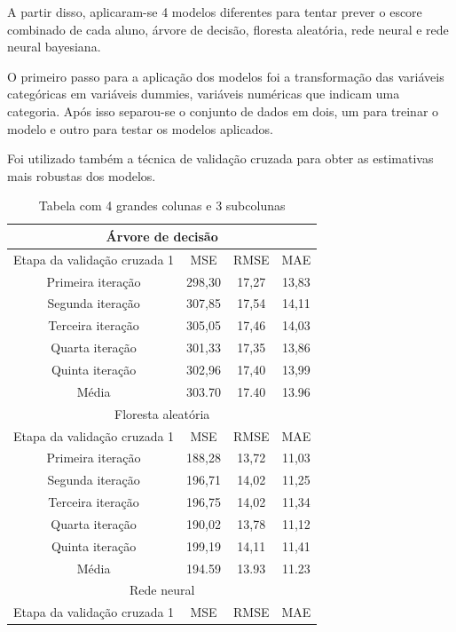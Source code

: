 A partir disso, aplicaram-se 4 modelos diferentes para tentar prever o escore combinado de cada aluno, árvore de decisão, floresta aleatória, rede neural e rede neural bayesiana.

O primeiro passo para a aplicação dos modelos foi a transformação das variáveis categóricas em variáveis dummies, variáveis numéricas que indicam uma categoria. Após isso separou-se o conjunto de dados em dois, um para treinar o modelo e outro para testar os modelos aplicados.

Foi utilizado também a técnica de validação cruzada para obter as estimativas mais robustas dos modelos.


\begin{table}[htbp]
    \centering
    \caption{Tabela com 4 grandes colunas e 3 subcolunas}
    \begin{tabular}{|c|c|c|c|}
        \hline
        \multicolumn{4}{|c|}{Árvore de decisão} \\ \hline
        Etapa da validação cruzada 1 & MSE & RMSE & MAE \\ \hline
        Primeira iteração & 298,30 & 17,27 & 13,83 \\ 
        Segunda iteração & 307,85 & 17,54 & 14,11 \\ 
        Terceira iteração & 305,05 & 17,46 & 14,03 \\ 
        Quarta iteração & 301,33 & 17,35 & 13,86 \\ 
        Quinta iteração & 302,96 & 17,40 & 13,99 \\ 
        Média & 303.70 & 17.40 & 13.96 \\
        \hline
        \multicolumn{4}{|c|}{Floresta aleatória} \\ \hline
        Etapa da validação cruzada 1 & MSE & RMSE & MAE \\ \hline
        Primeira iteração & 188,28 & 13,72 & 11,03 \\ 
        Segunda iteração & 196,71 & 14,02 & 11,25 \\ 
        Terceira iteração & 196,75 & 14,02 & 11,34 \\ 
        Quarta iteração & 190,02 & 13,78 & 11,12 \\ 
        Quinta iteração & 199,19 & 14,11 & 11,41 \\ 
        Média & 194.59 & 13.93 & 11.23 \\
        \hline
        \multicolumn{4}{|c|}{Rede neural} \\ \hline
        Etapa da validação cruzada 1 & MSE & RMSE & MAE \\ \hline

\end{tabular}
\end{table}
